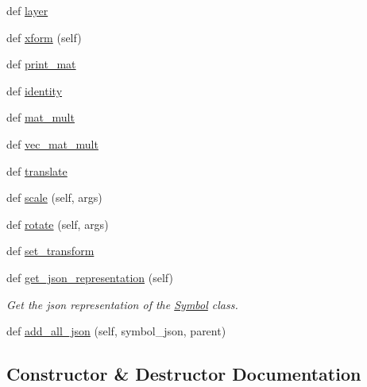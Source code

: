 \begin{DoxyCompactItemize}
\item 
def \hyperlink{classbridges_1_1symbol_1_1_symbol_ad6790e2dd8ac8b460cf8754aa0eb1e53}{layer}
\item 
def \hyperlink{classbridges_1_1symbol_1_1_symbol_a3530b78f812d3ca7bc34ba5736afea5e}{xform} (self)
\item 
def \hyperlink{classbridges_1_1symbol_1_1_symbol_af84e3be732b683c923a595a5a7a3a2b1}{print\+\_\+mat}
\item 
def \hyperlink{classbridges_1_1symbol_1_1_symbol_adb909c3e9ca02ba077f44490a15a27b5}{identity}
\item 
def \hyperlink{classbridges_1_1symbol_1_1_symbol_a84c2cfdb93fe1d3069d46531f35345ab}{mat\+\_\+mult}
\item 
def \hyperlink{classbridges_1_1symbol_1_1_symbol_a08e60402702fcc791d77840f854b3024}{vec\+\_\+mat\+\_\+mult}
\item 
def \hyperlink{classbridges_1_1symbol_1_1_symbol_a9080c013589fbf33c88ac7a688463614}{translate}
\item 
def \hyperlink{classbridges_1_1symbol_1_1_symbol_a999819dadc831d159447bd1289b4c9f1}{scale} (self, args)
\item 
def \hyperlink{classbridges_1_1symbol_1_1_symbol_a59ffe7b1ebdf446a316c592ed1967875}{rotate} (self, args)
\item 
def \hyperlink{classbridges_1_1symbol_1_1_symbol_a9c759a4a4aba53933dd791c2849dade5}{set\+\_\+transform}
\item 
def \hyperlink{classbridges_1_1symbol_1_1_symbol_a746f8e6d1fd1c63c8a9140a2af7436f8}{get\+\_\+json\+\_\+representation} (self)
\begin{DoxyCompactList}\small\item\em Get the json representation of the \hyperlink{classbridges_1_1symbol_1_1_symbol}{Symbol} class. \end{DoxyCompactList}\item 
def \hyperlink{classbridges_1_1symbol_1_1_symbol_aebfb998c2550502c8a20dfba371f0b19}{add\+\_\+all\+\_\+json} (self, symbol\+\_\+json, parent)
\end{DoxyCompactItemize}


\subsection{Constructor \& Destructor Documentation}
\mbox{\label{classbridges_1_1symbol_1_1_symbol_a57c7fcd41baccb9c2e15c9c828d957f6}} 
